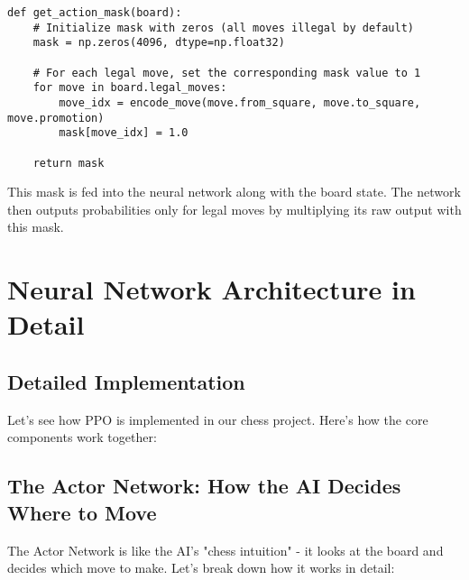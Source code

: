 \documentclass[11pt]{article}
\begin{document}
\begin{lstlisting}[style=Python]
def get_action_mask(board):
    # Initialize mask with zeros (all moves illegal by default)
    mask = np.zeros(4096, dtype=np.float32)
    
    # For each legal move, set the corresponding mask value to 1
    for move in board.legal_moves:
        move_idx = encode_move(move.from_square, move.to_square, move.promotion)
        mask[move_idx] = 1.0
    
    return mask
\end{lstlisting}

This mask is fed into the neural network along with the board state. The network then outputs probabilities only for legal moves by multiplying its raw output with this mask.

\section{Neural Network Architecture in Detail}

\subsection{Detailed Implementation}

Let's see how PPO is implemented in our chess project. Here's how the core components work together:

\subsection{The Actor Network: How the AI Decides Where to Move}

The Actor Network is like the AI's "chess intuition" - it looks at the board and decides which move to make. Let's break down how it works in detail:
\end{document}
